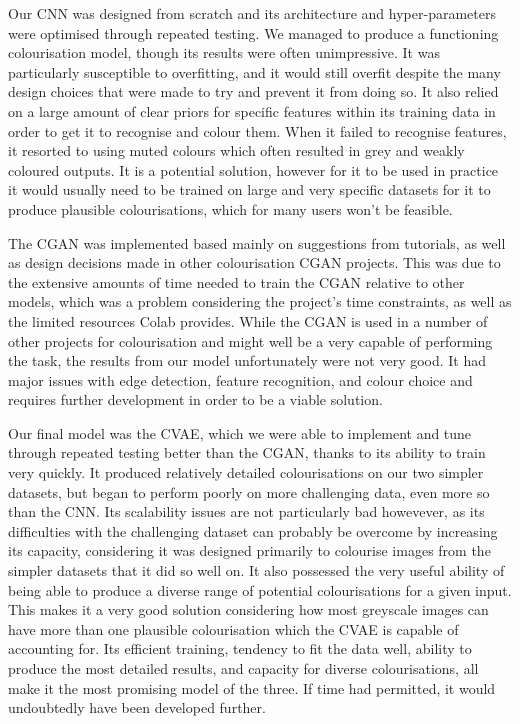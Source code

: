 \documentclass{l4proj}
\begin{document}
Our CNN was designed from scratch and its architecture and hyper-parameters were optimised through repeated testing. We managed to produce a functioning colourisation model, though its results were often unimpressive. It was particularly susceptible to overfitting, and it would still overfit despite the many design choices that were made to try and prevent it from doing so. It also relied on a large amount of clear priors for specific features within its training data in order to get it to recognise and colour them. When it failed to recognise features, it resorted to using muted colours which often resulted in grey and weakly coloured outputs. It is a potential solution, however for it to be used in practice it would usually need to be trained on large and very specific datasets for it to produce plausible colourisations, which for many users won't be feasible.

The CGAN was implemented based mainly on suggestions from tutorials, as well as design decisions made in other colourisation CGAN projects. This was due to the extensive amounts of time needed to train the CGAN relative to other models, which was a problem considering the project's time constraints, as well as the limited resources Colab provides. While the CGAN is used in a number of other projects for colourisation and might well be a very capable of performing the task, the results from our model unfortunately were not very good. It had major issues with edge detection, feature recognition, and colour choice and requires further development in order to be a viable solution.

Our final model was the CVAE, which we were able to implement and tune through repeated testing better than the CGAN, thanks to its ability to train very quickly. It produced relatively detailed colourisations on our two simpler datasets, but began to perform poorly on more challenging data, even more so than the CNN. Its scalability issues are not particularly bad howevever, as its difficulties with the challenging dataset can probably be overcome by increasing its capacity, considering it was designed primarily to colourise images from the simpler datasets that it did so well on. It also possessed the very useful ability of being able to produce a diverse range of potential colourisations for a given input. This makes it a very good solution considering how most greyscale images can have more than one plausible colourisation which the CVAE is capable of accounting for. Its efficient training, tendency to fit the data well, ability to produce the most detailed results, and capacity for diverse colourisations, all make it the most promising model of the three. If time had permitted, it would undoubtedly have been developed further.
\end{document}
